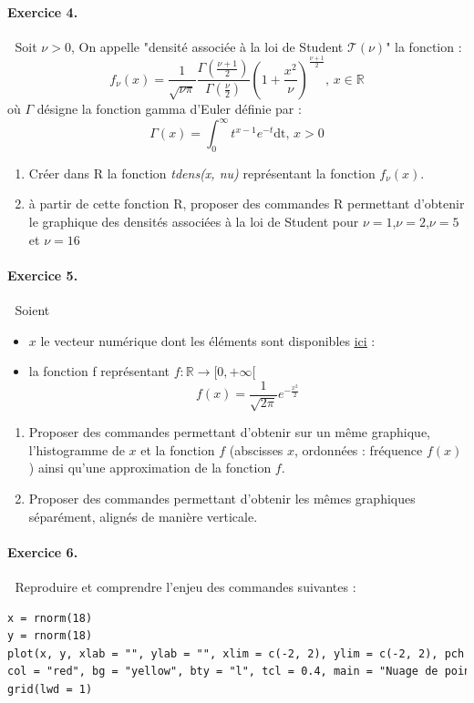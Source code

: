 \paragraph{Exercice 4. }\textcolor{white}{.}\newline
Soit $\nu > 0$, On appelle "densité associée à la loi de Student $\mathcal{T(\nu)}$" la fonction :
$$f_{\nu}(x) = \frac{1}{\sqrt{\nu\pi}}\frac{\Gamma\left(\frac{\nu+1}{2}\right)}{\Gamma\left(\frac{\nu}{2}\right)}\left(1 + \frac{x^{2}}{\nu}\right)^{\frac{\nu+1}{2}}\textrm{, }x\in \mathbb{R}$$
où $\Gamma$ désigne la fonction gamma d'Euler définie par :
$$\Gamma(x) = \int_{0}^{\infty} t^{x-1}e^{-t}\textrm{dt, } x>0$$
\begin{enumerate}
\item Créer dans R la fonction \textit{tdens(x, nu)} représentant la fonction $f_{\nu}(x)$.
\item à partir de cette fonction R, proposer des commandes R permettant d'obtenir le graphique des densités associées à la loi de Student pour $\nu =1$,$\nu =2$,$\nu =5$ et $\nu =16$ 
\end{enumerate}
\paragraph{Exercice 5. }\textcolor{white}{.}\newline
Soient
\begin{itemize}
\item $x$ le vecteur numérique dont les éléments sont disponibles \underline{\href{http://www.math.unicaen.fr/~chesneau/norm.txt}{ici}} :
\item la fonction f représentant $f : \mathbb{R} \rightarrow [0,+\infty[$
$$f(x) = \frac{1}{\sqrt{2\pi}}e^{-\frac{x^{2}}{2}}$$
\end{itemize}
\begin{enumerate}
\item Proposer des commandes permettant d'obtenir sur un même graphique, l'histogramme de $x$ et la fonction $f$ (abscisses $x$, ordonnées : fréquence $f(x)$) ainsi qu'une approximation de la fonction $f$.
\item Proposer des commandes permettant d'obtenir les mêmes graphiques séparément, alignés de manière verticale.
\end{enumerate}
\paragraph{Exercice 6. }\textcolor{white}{.}\newline
Reproduire et comprendre l'enjeu des commandes suivantes :
\begin{lstlisting}[language=html]
x = rnorm(18)
y = rnorm(18)
plot(x, y, xlab = "", ylab = "", xlim = c(-2, 2), ylim = c(-2, 2), pch = 22,
col = "red", bg = "yellow", bty = "l", tcl = 0.4, main = "Nuage de points")
grid(lwd = 1)
\end{lstlisting}
